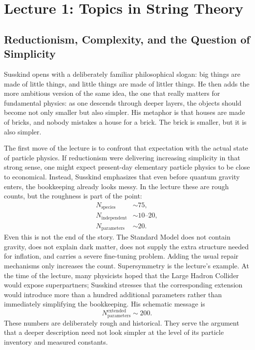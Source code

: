 \chapter{Lecture 1: Topics in String Theory}


\section{Reductionism, Complexity, and the Question of Simplicity}

Susskind opens with a deliberately familiar philosophical slogan: big things are made of little things, and little things are made of littler things. He then adds the more ambitious version of the same idea, the one that really matters for fundamental physics: as one descends through deeper layers, the objects should become not only smaller but also simpler. His metaphor is that houses are made of bricks, and nobody mistakes a house for a brick. The brick is smaller, but it is also simpler.

The first move of the lecture is to confront that expectation with the actual state of particle physics. If reductionism were delivering increasing simplicity in that strong sense, one might expect present-day elementary particle physics to be close to economical. Instead, Susskind emphasizes that even before quantum gravity enters, the bookkeeping already looks messy. In the lecture these are rough counts, but the roughness is part of the point:
\begin{equation}
\begin{aligned}
N_{\mathrm{species}}&\sim 75,\\
N_{\mathrm{independent}}&\sim 10\text{--}20,\\
N_{\mathrm{parameters}}&\sim 20.
\end{aligned}
\end{equation}
Even this is not the end of the story. The Standard Model does not contain gravity, does not explain dark matter, does not supply the extra structure needed for inflation, and carries a severe fine-tuning problem. Adding the usual repair mechanisms only increases the count. Supersymmetry is the lecture's example. At the time of the lecture, many physicists hoped that the Large Hadron Collider would expose superpartners; Susskind stresses that the corresponding extension would introduce more than a hundred additional parameters rather than immediately simplifying the bookkeeping. His schematic message is
\begin{equation}
N_{\mathrm{parameters}}^{\mathrm{extended}} \sim 200.
\end{equation}
These numbers are deliberately rough and historical. They serve the argument that a deeper description need not look simpler at the level of its particle inventory and measured constants.

